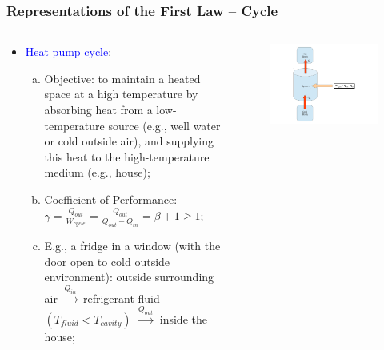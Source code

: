 \documentclass[10pt,compress,handout,ignorenonframetext]{beamer}
\begin{document}
\begin{frame}
 \frametitle{Representations of the First Law -- Cycle}
 \begin{columns}
  \begin{column}[l]{0.5\linewidth}
   \begin{itemize}
    \item <1-> \textcolor{blue}{Heat pump cycle}:
     \begin{enumerate}[(a)]
      \item <2-> Objective: to maintain a heated space at a high temperature by absorbing heat from a low-temperature source (e.g., well water or cold outside air), and supplying this heat to the high-temperature medium (e.g., house);
      \item <3-> Coefficient of Performance: $\gamma = \displaystyle\frac{Q_{out}}{W_{cycle}} = \displaystyle\frac{Q_{out}}{Q_{out} - Q_{in}} = \beta + 1 \geq 1$;
      \item <4-> E.g., a fridge in a window (with the door open to cold outside environment): outside surrounding air $\xrightarrow{Q_{in}}$ refrigerant fluid $\left(T_{fluid} < T_{cavity}\right)$ $\xrightarrow{Q_{out}}$ inside the house; 
     \end{enumerate}
   \end{itemize}
  \end{column}
   
  \begin{column}[c]{0.5\linewidth}
   \begin{figure}%
    \begin{center}
     \includegraphics[width=8.cm,clip]{./Pics/FirstLaw_Cycle_02}
    \end{center}
   \end{figure}    
  \end{column}
 \end{columns}
 \normalsize
\end{frame}
\end{document}
